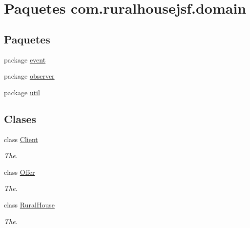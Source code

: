 \hypertarget{namespacecom_1_1ruralhousejsf_1_1domain}{}\section{Paquetes com.\+ruralhousejsf.\+domain}
\label{namespacecom_1_1ruralhousejsf_1_1domain}
\subsection*{Paquetes}
\begin{DoxyCompactItemize}
\item 
package \mbox{\hyperlink{namespacecom_1_1ruralhousejsf_1_1domain_1_1event}{event}}
\item 
package \mbox{\hyperlink{namespacecom_1_1ruralhousejsf_1_1domain_1_1observer}{observer}}
\item 
package \mbox{\hyperlink{namespacecom_1_1ruralhousejsf_1_1domain_1_1util}{util}}
\end{DoxyCompactItemize}
\subsection*{Clases}
\begin{DoxyCompactItemize}
\item 
class \mbox{\hyperlink{classcom_1_1ruralhousejsf_1_1domain_1_1_client}{Client}}
\begin{DoxyCompactList}\small\item\em The. \end{DoxyCompactList}\item 
class \mbox{\hyperlink{classcom_1_1ruralhousejsf_1_1domain_1_1_offer}{Offer}}
\begin{DoxyCompactList}\small\item\em The. \end{DoxyCompactList}\item 
class \mbox{\hyperlink{classcom_1_1ruralhousejsf_1_1domain_1_1_rural_house}{Rural\+House}}
\begin{DoxyCompactList}\small\item\em The. \end{DoxyCompactList}\end{DoxyCompactItemize}
